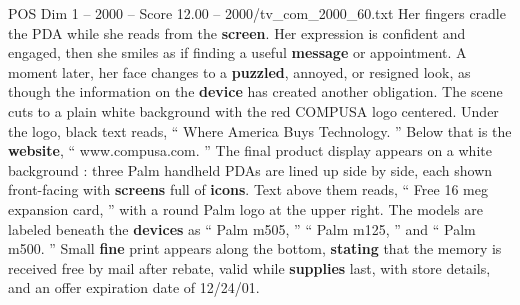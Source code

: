 \begin{textsample}{POS Dim 1 – 2000 – Score 12.00 – 2000/tv\_com\_2000\_60.txt}
Her fingers cradle the PDA while she reads from the \textbf{screen}.
Her expression is confident and engaged, then she smiles as if finding a useful \textbf{message} or appointment.
A moment later, her face changes to a \textbf{puzzled}, annoyed, or resigned look, as though the information on the \textbf{device} has created another obligation.
The scene cuts to a plain white background with the red COMPUSA logo centered.
Under the logo, black text reads, “ Where America Buys Technology. ” Below that is the \textbf{website}, “ www.compusa.com. ” The final product display appears on a white background : three Palm handheld PDAs are lined up side by side, each shown front-facing with \textbf{screens} full of \textbf{icons}.
Text above them reads, “ Free 16 meg expansion card, ” with a round Palm logo at the upper right.
The models are labeled beneath the \textbf{devices} as “ Palm m505, ” “ Palm m125, ” and “ Palm m500. ” Small \textbf{fine} print appears along the bottom, \textbf{stating} that the memory is received free by mail after rebate, valid while \textbf{supplies} last, with store details, and an offer expiration date of 12/24/01.

\end{textsample}
